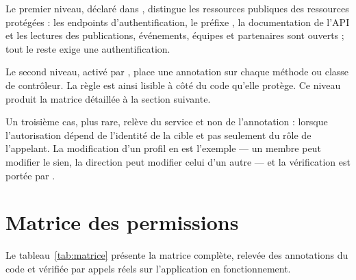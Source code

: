 Le premier niveau, déclaré dans , distingue les ressources publiques
des ressources protégées : les endpoints d'authentification, le préfixe ,
la documentation de l'API et les lectures des publications, événements, équipes et
partenaires sont ouverts ; tout le reste exige une authentification.

Le second niveau, activé par , place une annotation
 sur chaque méthode ou classe de contrôleur. La règle est ainsi lisible
à côté du code qu'elle protège. Ce niveau produit la matrice détaillée à la section
suivante.

Un troisième cas, plus rare, relève du service et non de l'annotation : lorsque
l'autorisation dépend de l'identité de la cible et pas seulement du rôle de l'appelant. La
modification d'un profil en est l'exemple --- un membre peut modifier le sien, la direction
peut modifier celui d'un autre --- et la vérification est portée par
.

\section{Matrice des permissions}

Le tableau~\ref{tab:matrice} présente la matrice complète, relevée des annotations du code
et vérifiée par appels réels sur l'application en fonctionnement.

